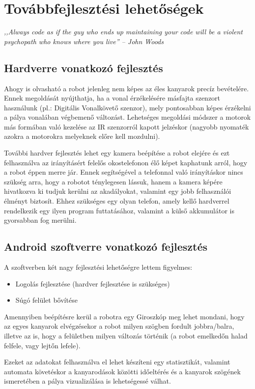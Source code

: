 \documentclass[]{thesis-ekf}
\theoremstyle{definition}
\begin{document}
\chapter{Továbbfejlesztési lehetőségek}
\emph{,,Always code as if the guy who ends up maintaining your code will be a violent psychopath who knows where you live'' -- John Woods}
\section{Hardverre vonatkozó fejlesztés}
Ahogy  is olvasható a robot jelenleg nem képes az éles kanyarok precíz bevételére. Ennek megoldását nyújthatja, ha a vonal érzékelésére másfajta szenzort használunk (pl.: Digitális Vonalkövető szenzor), mely pontosabban képes érzékelni a pálya vonalában végbemenő változást.
Lehetséges megoldási módszer a motorok más formában való kezelése az IR szenzorról kapott jelzéskor (nagyobb nyomaték azokra a motorokra melyeknek előre kell mozdulni).

További hardver fejlesztés lehet egy kamera beépítése a robot elejére és ezt felhasználva az irányításért felelős okostelefonon élő képet kaphatunk arról, hogy a robot éppen merre jár. Ennek segítségével a telefonnal való irányításkor nincs szükség arra, hogy a robotot ténylegesen lássuk, hanem a kamera képére hivatkozva ki tudjuk kerülni az akadályokat, valamint egy jobb felhasználói élményt biztosít. Ehhez szükséges egy olyan telefon, amely kellő hardverrel rendelkezik egy ilyen program futtatásához, valamint a külső akkumulátor is gyorsabban fog merülni.
\section{Android szoftverre vonatkozó fejlesztés}
A szoftverben két nagy fejlesztési lehetőségre lettem figyelmes:
\begin{itemize}
	\item Logolás fejlesztése (hardver fejlesztése is szükséges)
	\item Súgó felület bővítése
\end{itemize}
Amennyiben beépítésre kerül a robotra egy Giroszkóp meg lehet mondani, hogy az egyes kanyarok elvégzésekor a robot milyen szögben fordult jobbra/balra, illetve az is, hogy a felületben milyen változás történik (a robot emelkedőn halad felfele, vagy lejtőn lefele).

Ezeket az adatokat felhasználva el lehet készíteni egy statisztikát, valamint automata követéskor a kanyarodások közötti időeltérés és a kanyarok szögének ismeretében a pálya vizualizálása is lehetségessé válhat.
\end{document}
